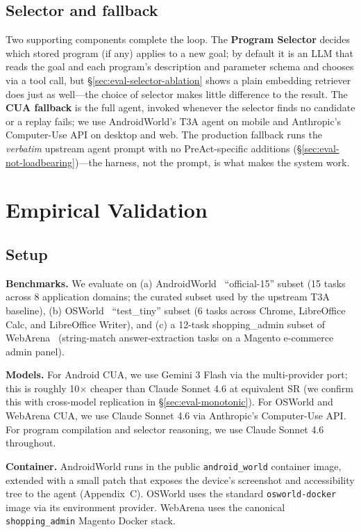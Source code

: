 \documentclass[11pt]{article}
\begin{document}
\subsection{Selector and fallback}
\label{sec:arch-selector}

Two supporting components complete the loop. The \textbf{Program Selector} decides which stored program (if any) applies to a new goal; by default it is an LLM that reads the goal and each program's description and parameter schema and chooses via a tool call, but \S\ref{sec:eval-selector-ablation} shows a plain embedding retriever does just as well---the choice of selector makes little difference to the result. The \textbf{CUA fallback} is the full agent, invoked whenever the selector finds no candidate or a replay fails; we use AndroidWorld's T3A agent on mobile and Anthropic's Computer-Use API on desktop and web. The production fallback runs the \emph{verbatim} upstream agent prompt with no PreAct-specific additions (\S\ref{sec:eval-not-loadbearing})---the harness, not the prompt, is what makes the system work.

\section{Empirical Validation}
\label{sec:eval}

\subsection{Setup}
\label{sec:eval-setup}

\textbf{Benchmarks.} We evaluate on (a) AndroidWorld~\cite{rawles2024androidworld} ``official-15'' subset (15 tasks across 8 application domains; the curated subset used by the upstream T3A baseline), (b) OSWorld~\cite{xie2024osworld} ``test\_tiny'' subset (6 tasks across Chrome, LibreOffice Calc, and LibreOffice Writer), and (c) a 12-task shopping\_admin subset of WebArena~\cite{zhou2024webarena} (string-match answer-extraction tasks on a Magento e-commerce admin panel).

\textbf{Models.} For Android CUA, we use Gemini 3 Flash via the multi-provider port; this is roughly 10$\times$ cheaper than Claude Sonnet 4.6 at equivalent SR (we confirm this with cross-model replication in \S\ref{sec:eval-monotonic}). For OSWorld and WebArena CUA, we use Claude Sonnet 4.6 via Anthropic's Computer-Use API. For program compilation and selector reasoning, we use Claude Sonnet 4.6 throughout.

\textbf{Container.} AndroidWorld runs in the public \texttt{android\_world} container image, extended with a small patch that exposes the device's screenshot and accessibility tree to the agent (Appendix~C). OSWorld uses the standard \texttt{osworld-docker} image via its environment provider. WebArena uses the canonical \texttt{shopping\_admin} Magento Docker stack.
\end{document}
